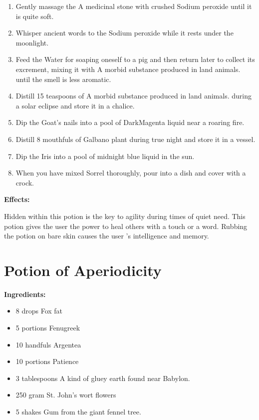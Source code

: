 \documentclass{article}
\begin{document}
\begin{enumerate}
  \item Gently massage the A medicinal stone with crushed Sodium peroxide until it is quite soft.
  \item Whisper ancient words to the Sodium peroxide while it rests under the moonlight.
  \item Feed the Water for soaping oneself to a pig and then return later to collect its excrement, mixing it with A morbid substance produced in land animals. until the smell is less aromatic.
  \item Distill 15 teaspoons of A morbid substance produced in land animals. during a solar eclipse and store it in a chalice.
  \item Dip the Goat's nails into a pool of DarkMagenta liquid near a roaring fire.
  \item Distill 8 mouthfuls of Galbano plant during true night and store it in a vessel.
  \item Dip the Iris into a pool of midnight blue liquid in the sun.
  \item When you have mixed Sorrel thoroughly, pour into a dish and cover with a crock.
\end{enumerate}

\textbf{Effects:}

Hidden within this potion is the key to agility during times of quiet need. This potion gives the user the power to heal others with a touch or a word. Rubbing the potion on bare skin causes the user 's intelligence and memory.

\newpage
\section*{Potion of Aperiodicity}

\textbf{Ingredients:}

\begin{itemize}
  \item 8 drops Fox fat
  \item 5 portions Fenugreek
  \item 10 handfuls Argentea
  \item 10 portions Patience
  \item 3 tablespoons A kind of gluey earth found near Babylon.
  \item 250 gram St. John's wort flowers
  \item 5 shakes Gum from the giant fennel tree.
\end{itemize}
\end{document}
